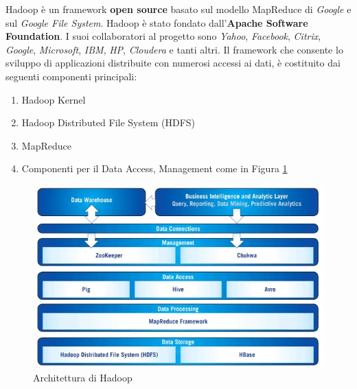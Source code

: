 \documentclass[11pt]{article}
\begin{document}
Hadoop è un framework \textbf{open source} basato sul modello MapReduce di \emph{Google} e sul \emph{Google File System}. Hadoop è stato fondato dall'\textbf{Apache Software Foundation}. I suoi collaboratori al progetto sono \emph{Yahoo}, \emph{Facebook}, \emph{Citrix}, \emph{Google}, \emph{Microsoft}, \emph{IBM}, \emph{HP}, \emph{Cloudera} e tanti altri. Il framework che consente lo sviluppo di applicazioni distribuite con numerosi accessi ai dati, è costituito dai seguenti componenti principali:
\begin{enumerate}
	\item Hadoop Kernel
	\item Hadoop Distributed File System (HDFS)
	\item MapReduce
	\item Componenti per il Data Access, Management come in Figura \ref{archdopp}
\end{enumerate}

\begin{figure}[H]
	\centering
	\includegraphics[scale=0.93]{images/hadoop-architecture.jpg}
	\caption{Architettura di Hadoop \cite{hadoop}}
	\label{archdopp}
\end{figure}
\end{document}
